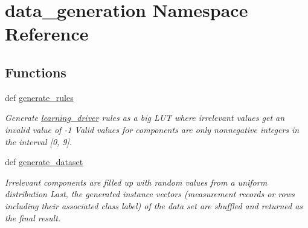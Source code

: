 \hypertarget{namespacedata__generation}{\section{data\+\_\+generation Namespace Reference}
\label{namespacedata__generation}
}
\subsection*{Functions}
\begin{DoxyCompactItemize}
\item 
def \hyperlink{namespacedata__generation_a723f3547cdfa6066526de7b8964a0a49}{generate\+\_\+rules}
\begin{DoxyCompactList}\small\item\em Generate \hyperlink{namespacelearning__driver}{learning\+\_\+driver} rules as a big L\+U\+T where irrelevant values get an invalid value of -\/1 Valid values for components are only nonnegative integers in the interval \mbox{[}0, 9\mbox{]}. \end{DoxyCompactList}\item 
def \hyperlink{namespacedata__generation_a0a700e2749ed935a31ac58217132cb76}{generate\+\_\+dataset}
\begin{DoxyCompactList}\small\item\em Irrelevant components are filled up with random values from a uniform distribution Last, the generated instance vectors (measurement records or rows including their associated class label) of the data set are shuffled and returned as the final result. \end{DoxyCompactList}\end{DoxyCompactItemize}
